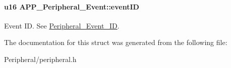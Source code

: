 \paragraph[{\texorpdfstring{event\+ID}{eventID}}]{\setlength{\rightskip}{0pt plus 5cm}u16 A\+P\+P\+\_\+\+Peripheral\+\_\+\+Event\+::event\+ID}\hypertarget{struct_a_p_p___peripheral___event_a941104e706ef4c746ed8e5bbf9eb393a}{}\label{struct_a_p_p___peripheral___event_a941104e706ef4c746ed8e5bbf9eb393a}
Event ID. See \hyperlink{group___a_p_p___p_e_r_i_p_h_e_r_a_l_ga0bafa1da04bd0103ec3e3f4ef8316d2e}{Peripheral\+\_\+\+Event\+\_\+\+ID}. 

The documentation for this struct was generated from the following file\+:\begin{DoxyCompactItemize}
\item 
Peripheral/peripheral.\+h\end{DoxyCompactItemize}

